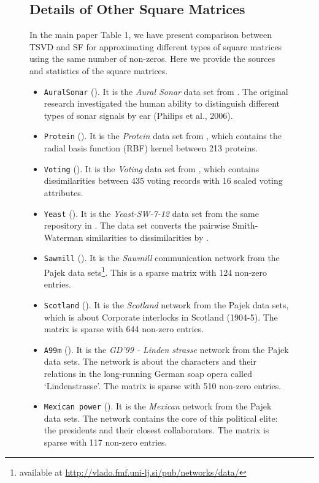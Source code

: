 \documentclass{article}
\begin{document}
\begin{figure}[t]
\begin{center}
\subsection{Details of Other Square Matrices}
\label{appendix:details}
In the main paper Table 1, we have present comparison between TSVD and SF for approximating different types of square matrices using the same number of non-zeros. Here we provide the sources and statistics of the square matrices.
\begin{itemize}
    \item \texttt{AuralSonar} (). It is the \emph{Aural Sonar} data set from \citep{chen2009similarity}. The original research investigated the human ability to distinguish different types of sonar signals by ear (Philips et al., 2006).
    \item \texttt{Protein} (). It is the \emph{Protein} data set from \citep{chen2009similarity}, which contains the radial basis function (RBF) kernel between 213 proteins.
    \item \texttt{Voting} (). It is the \emph{Voting} data set from \citep{chen2009similarity}, which contains dissimilarities between 435 voting records with 16 scaled voting attributes.
    \item \texttt{Yeast} (). It is the \emph{Yeast-SW-7-12} data set from the same repository in \citep{chen2009similarity}. The data set converts the pairwise Smith-Waterman similarities \citep{lanckriet2004kernel,xu2014ricci} to dissimilarities by .
    \item \texttt{Sawmill} (). It is the \emph{Sawmill} communication network from the Pajek data sets\footnote{available at \url{http://vlado.fmf.uni-lj.si/pub/networks/data/}}. This is a sparse matrix with 124 non-zero entries.
    \item \texttt{Scotland} (). It is the \emph{Scotland} network from the Pajek data sets, which is about Corporate interlocks in Scotland (1904-5). The matrix is sparse with 644 non-zero entries.
    \item \texttt{A99m} (). It is the \emph{GD'99 - Linden strasse} network from the Pajek data sets. The network is about the characters and their relations in the long-running German soap opera called `Lindenstrasse'. The matrix is sparse with 510 non-zero entries.
    \item \texttt{Mexican power} (). It is the \emph{Mexican} network from the Pajek data sets. The network contains the core of this political elite: the presidents and their closest collaborators. The matrix is sparse with 117 non-zero entries.

\end{itemize}
\end{center}
\end{figure}
\end{document}
